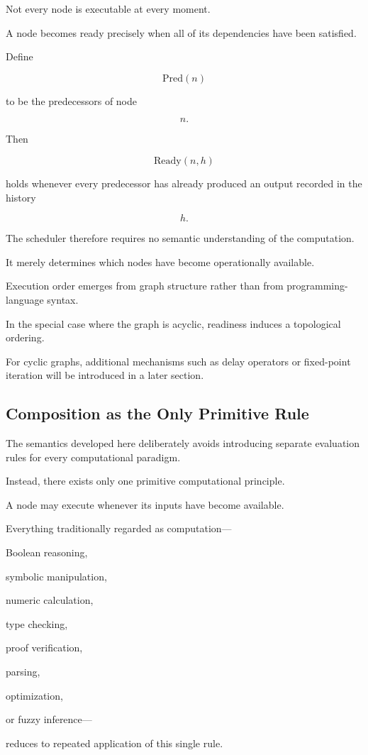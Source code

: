\documentclass[12pt,oneside]{article}
\begin{document}
Not every node is executable at every moment.

A node becomes ready precisely when all of its dependencies have been satisfied.

Define

\[
\mathrm{Pred}(n)
\]

to be the predecessors of node

\[
n.
\]

Then

\[
\mathrm{Ready}(n,h)
\]

holds whenever every predecessor has already produced an output recorded in the history

\[
h.
\]

The scheduler therefore requires no semantic understanding of the computation.

It merely determines which nodes have become operationally available.

Execution order emerges from graph structure rather than from programming-language syntax.

In the special case where the graph is acyclic, readiness induces a topological ordering.

For cyclic graphs, additional mechanisms such as delay operators or fixed-point iteration will be introduced in a later section.

\subsection{Composition as the Only Primitive Rule}

The semantics developed here deliberately avoids introducing separate evaluation rules for every computational paradigm.

Instead, there exists only one primitive computational principle.

A node may execute whenever its inputs have become available.

Everything traditionally regarded as computation—

Boolean reasoning,

symbolic manipulation,

numeric calculation,

type checking,

proof verification,

parsing,

optimization,

or fuzzy inference—

reduces to repeated application of this single rule.
\end{document}
